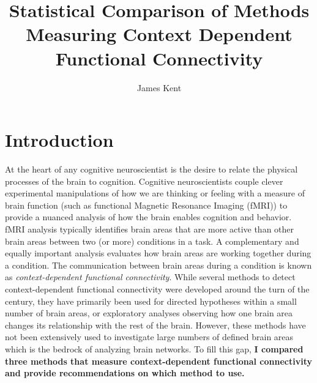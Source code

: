 \documentclass[phd,figures,tables,ackpage,abstractpage,publicabstractpage]{uithesis}
\title{Statistical Comparison of Methods Measuring Context Dependent Functional Connectivity}
\author{James Kent}
\begin{document}
\frontmatter
\chapter{Introduction}

At the heart of any cognitive neuroscientist is the desire to relate the physical
processes of the brain to cognition.
Cognitive neuroscientists couple clever experimental manipulations
of how we are thinking or feeling with a measure of brain function
(such as functional Magnetic Resonance Imaging (fMRI)) to provide a nuanced
analysis of how the brain enables cognition and behavior.
fMRI analysis typically identifies brain areas that are more
active than other brain areas between two (or more) conditions in a task.
A complementary and equally important analysis evaluates how brain areas
are working together during a condition.
The communication between brain areas during a condition is known as
\textit{context-dependent functional connectivity}.
While several methods to detect context-dependent functional connectivity
were developed around the turn of the century, they have primarily
been used for directed hypotheses within a small number of brain areas, or
exploratory analyses observing how one brain area changes its relationship
with the rest of the brain.
However, these methods have not been extensively used to investigate large numbers of defined
brain areas which is the bedrock of analyzing brain networks.
To fill this gap, \textbf{I compared three methods that measure context-dependent functional connectivity
and provide recommendations on which method to use.}
\end{document}

